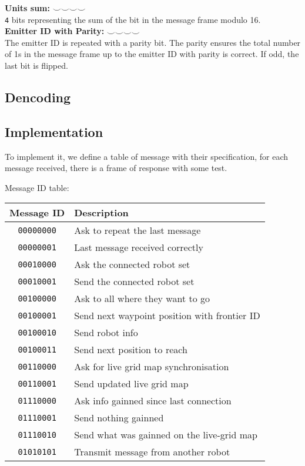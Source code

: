 \documentclass[main.tex]{subfiles}
\begin{document}
\textbf{Units sum:} $\smallsmile \smallsmile \smallsmile \smallsmile$\\
\texttt{4} bits representing the sum of the bit in the message frame modulo 16. \\ 

\textbf{Emitter ID with Parity:} $\smallsmile \smallsmile \smallsmile \smallsmile$\\
The emitter ID is repeated with a parity bit. The parity ensures the total number of 1s in the message frame up to the emitter ID with parity is correct. If odd, the last bit is flipped. \\



\subsection{Dencoding}


\subsection{Implementation}

To implement it, we define a table of message with their specification, for each message received, there is a frame of response with some test.


Message ID table:
\begin{table}[H]
	\centering
	\begin{tabular}{c l}
		\hline
		\textbf{Message ID} & \textbf{Description} \\
		\hline
		\texttt{00000000} & Ask to repeat the last message\\
		\texttt{00000001} & Last message received correctly\\[5pt]
		
		\texttt{00010000} & Ask the connected robot set\\
		\texttt{00010001} & Send the connected robot set\\[5pt]
		
		\texttt{00100000} & Ask to all where they want to go\\
		\texttt{00100001} & Send next waypoint position with frontier ID\\
		\texttt{00100010} & Send robot info\\
		\texttt{00100011} & Send next position to reach\\[5pt]
		
		\texttt{00110000} & Ask for live grid map synchronisation\\
		\texttt{00110001} & Send updated live grid map\\[5pt]
		
		\texttt{01110000} & Ask info gainned since last connection\\
		\texttt{01110001} & Send nothing gainned\\
		\texttt{01110010} & Send what was gainned on the live-grid map\\[5pt]

		\texttt{01010101} & Transmit message from another robot\\
		\hline
	\end{tabular}
\end{table}
\end{document}
